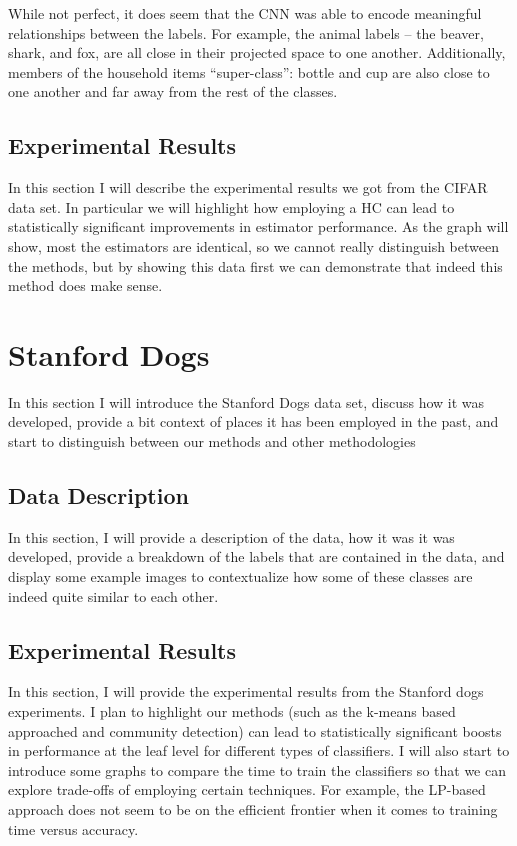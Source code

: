 \documentclass[../thesis.tex]{subfiles}
\begin{document}
While not perfect, it does seem that the CNN was able to encode meaningful
relationships between the labels. For example, the animal labels -- the beaver,
shark, and fox, are all close in their projected space to one another.
Additionally, members of the household items ``super-class'': bottle and cup are
also close to one another and far away from the rest of the classes.

\subsection{Experimental Results}
In this section I will describe the experimental results we got from the CIFAR
data set. In particular we will highlight how employing a HC can lead to
statistically significant improvements in estimator performance. As the graph
will show, most the estimators are identical, so we cannot really distinguish
between the methods, but by showing this data first we can demonstrate that
indeed this method does make sense.

\section{Stanford Dogs}
In this section I will introduce the Stanford Dogs data set, discuss how it was
developed, provide a bit context of places it has been employed in the past, and
start to distinguish between our methods and other methodologies

\subsection{Data Description}
In this section, I will provide a description of the data, how it was it was
developed, provide a breakdown of the labels that are contained in the data, and
display some example images to contextualize how some of these classes are
indeed quite similar to each other.

\subsection{Experimental Results}
In this section, I will provide the experimental results from the Stanford dogs
experiments. I plan to highlight our methods (such as the k-means based
approached and community detection) can lead to statistically significant boosts
in performance at the leaf level for different types of classifiers. I will also
start to introduce some graphs to compare the time to train the classifiers so
that we can explore trade-offs of employing certain techniques. For example, the
LP-based approach does not seem to be on the efficient frontier when it comes to
training time versus accuracy.
\end{document}
